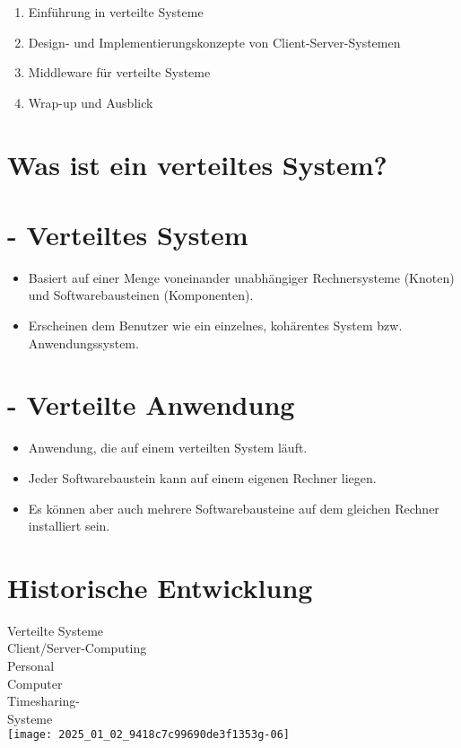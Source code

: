 \documentclass[10pt]{article}
\begin{document}
\begin{enumerate}
  \item Einführung in verteilte Systeme
  \item Design- und Implementierungskonzepte von Client-Server-Systemen
  \item Middleware für verteilte Systeme
  \item Wrap-up und Ausblick
\end{enumerate}

\section*{Was ist ein verteiltes System?}
\section*{- Verteiltes System}
\begin{itemize}
  \item Basiert auf einer Menge voneinander unabhängiger Rechnersysteme (Knoten) und Softwarebausteinen (Komponenten).
  \item Erscheinen dem Benutzer wie ein einzelnes, kohärentes System bzw. Anwendungssystem.
\end{itemize}

\section*{- Verteilte Anwendung}
\begin{itemize}
  \item Anwendung, die auf einem verteilten System läuft.
  \item Jeder Softwarebaustein kann auf einem eigenen Rechner liegen.
  \item Es können aber auch mehrere Softwarebausteine auf dem gleichen Rechner installiert sein.
\end{itemize}

\section*{Historische Entwicklung}
Verteilte Systeme\\
Client/Server-Computing\\
Personal\\
Computer\\
Timesharing-\\
Systeme\\
\texttt{[image: 2025\_01\_02\_9418c7c99690de3f1353g-06]}
\end{document}
